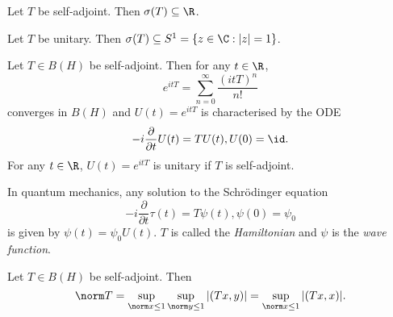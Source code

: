 \documentclass[a4paper]{article}
\begin{document}
\begin{corollary}
  Let \(T\) be self-adjoint. Then \(\sigma(T) \subseteq \R\).
\end{corollary}

\begin{ex}
  Let \(T\) be unitary. Then \(\sigma(T) \subseteq S^1 = \{z \in \C: |z| = 1\}\).
\end{ex}

\begin{eg}
  Let \(T \in B(H)\) be self-adjoint. Then for any \(t \in \R\),
  \[
    e^{it T} = \sum_{n = 0}^\infty \frac{(itT)^n}{n!}
  \]
  converges in \(B(H)\) and \(U(t) = e^{itT}\) is characterised by the ODE
  \[
    -i \frac{\partial  }{\partial t} U(t) = T U(t), U(0) = \id.
  \]
  For any \(t \in \R\), \(U(t) = e^{it T}\) is unitary if \(T\) is self-adjoint.

  In quantum mechanics, any solution to the Schrödinger equation
  \[
    -i \frac{\partial  }{\partial t} \tau(t) = T \psi(t), \psi(0) = \psi_0
  \]
  is given by \(\psi(t) = \psi_0 U(t)\). \(T\) is called the \emph{Hamiltonian} and \(\psi\) is the \emph{wave function}.
\end{eg}

\begin{lemma}
  Let \(T \in B(H)\) be self-adjoint. Then
  \[
    \norm T = \sup_{\norm x \leq 1} \sup_{\norm y \leq 1} |(Tx, y)| = \sup_{\norm x \leq 1} |(Tx, x)|.
  \]
\end{lemma}
\end{document}
